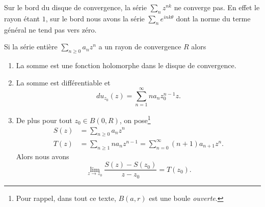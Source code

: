 \begin{remark}
    Sur le bord du disque de convergence, la série \( \sum_nz^{nk}\) ne converge pas. En effet le rayon étant \( 1\), sur le bord nous avons la série \( \sum_n e^{ink\theta}\) dont la norme du terme général ne tend pas vers zéro.
\end{remark}

\begin{proposition}     \label{PropSNMEooVgNqBP} 
    Si la série entière \( \sum_{n\geq 0}a_nz^n\) a un rayon de convergence \( R\) alors
    \begin{enumerate}
        \item
            La somme est une fonction holomorphe dans le disque de convergence.
        \item       \label{ItemUULDooEGRNiA}
            La somme est différentiable et
            \begin{equation}
                du_{z_0}(z)=\sum_{n=1}^{\infty}na_nz_0^{n-1}z.
            \end{equation}
        \item
    De plus pour tout \( z_0\in B(0,R)\), on pose\footnote{Pour rappel, dans tout ce texte, \( B(a,r)\) est une boule \emph{ouverte}.}
    \begin{subequations}
        \begin{align}
            S(z)&=\sum_{n\geq 0}a_nz^n\\
            T(z)&=\sum_{n\geq 1}na_nz^{n-1}=\sum_{n=0}^{\infty}(n+1)a_{n+1}z^n.
        \end{align}
    \end{subequations}
    Alors  nous avons
    \begin{equation}    \label{EqVQDPooOPICwN}
        \lim_{z\to z_0}\frac{ S(z)-S(z_0) }{ z-z_0 }=T(z_0).
    \end{equation}
    \end{enumerate}
\end{proposition}

